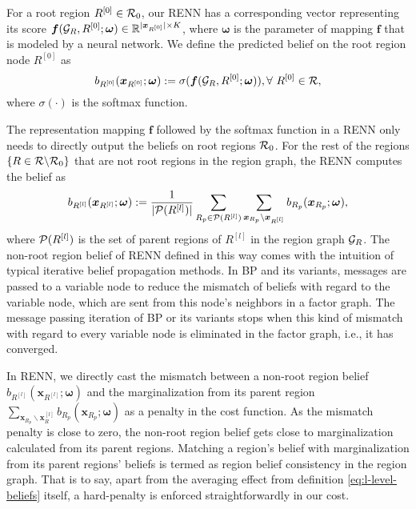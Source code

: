 For a root region $R^{[0]}\in \mathcal{R}_0$, our RENN has a corresponding vector representing its score $\bm{f}(\mathcal{G}_R, R^{[0]}; \bm{\omega}) \in \mathbb{R}^{|{\bm{x}_{R^{[0]}}}| \times K}$, where $\bm{\omega}$ is the parameter of mapping $\bm{f}$ that is modeled by a neural network. We define the predicted belief on the root region node $R^{[0]}$ as
\begin{equation}
  b_{R^{[0]}}(\bm{x}_{R^{[0]}}; \bm{\omega}) := \sigma(\bm{f}(\mathcal{G}_R, R^{[0]}; \bm{\omega})), \forall~ {R^{[0]}} \in \mathcal{R},
\end{equation}
where $\sigma(\cdot)$ is the softmax function.

The representation mapping $\bm{f}$ followed by the softmax function in a RENN only needs to directly output the beliefs on root regions $\mathcal{R}_0$.
For the rest of the regions $\left\{R \in \mathcal{R} \backslash \mathcal{R}_0 \right\}$ that are not root regions in the region graph, the RENN computes the belief as
\begin{equation}\label{eq:l-level-beliefs}
  b_{R^{[l]}}(\bm{x}_{R^{[l]}}; \bm{\omega}) := \frac{1}{|\mathcal{P}(R^{[l]})|} \sum_{R_p\in  \mathcal{P}(R^{[l]})}\sum_{\bm{x}_{R_p}\backslash \bm{x}_{R^{[l]}}} b_{R_p}(\bm{x}_{R_p}; \bm{\omega}),
\end{equation}
where $\mathcal{P}(R^{[l]})$ is the set of parent regions of $R^{[l]}$ in the region graph $\mathcal{G}_R$. The non-root region belief of RENN defined in this way comes with the intuition of typical iterative belief propagation methods. In BP and its variants, messages are passed to a variable node to reduce the mismatch of beliefs with regard to the variable node, which are sent from this node's neighbors in a factor graph. The message passing iteration of BP or its variants stops when this kind of mismatch with regard to every variable node is eliminated in the factor graph, i.e., it has converged.

In RENN, we directly cast the mismatch between a non-root region belief $b_{R^{[l]}}(\bm{x}_{R^{[l]}}; \bm{\omega})$ and the marginalization from its parent region $\sum_{\bm{x}_{R_p}\backslash \bm{x}_R^{[l]}}b_{R_p}(\bm{x}_{R_p}; \bm{\omega})$ as a penalty in the cost function. As the mismatch penalty is close to zero, the non-root region belief gets close to marginalization calculated from its parent regions. Matching a region's belief with marginalization from its parent regions' beliefs is termed as region belief consistency in the region graph. That is to say, apart from the averaging effect from definition \eqref{eq:l-level-beliefs} itself, a hard-penalty is enforced straightforwardly in our cost.

